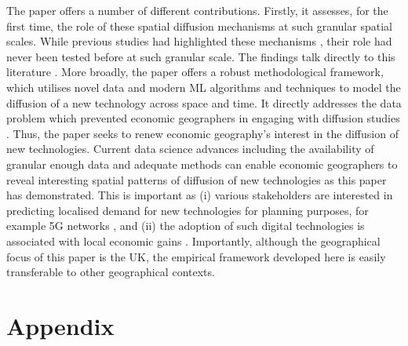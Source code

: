 \documentclass[
  authoryear,
  preprint,
  3p]{elsarticle}
\begin{document}
The paper offers a number of different contributions. Firstly, it
assesses, for the first time, the role of these spatial diffusion
mechanisms at such granular spatial scales. While previous studies had
highlighted these mechanisms
\citep{hagerstrand1968innovation, rogers2010diffusion, grubler1990rise},
their role had never been tested before at such granular scale. The
findings talk directly to this literature
\citep[e.g.][]{beardsell1999spatial, haller2011determinants, lengyel2020role}.
More broadly, the paper offers a robust methodological framework, which
utilises novel data and modern ML algorithms and techniques to model the
diffusion of a new technology across space and time. It directly
addresses the data problem which prevented economic geographers in
engaging with diffusion studies
\citep{iso2005, kemeny2011international, zook2022mapping}. Thus, the
paper seeks to renew economic geography's interest in the diffusion of
new technologies. Current data science advances including the
availability of granular enough data and adequate methods can enable
economic geographers to reveal interesting spatial patterns of diffusion
of new technologies as this paper has demonstrated. This is important as
(i) various stakeholders are interested in predicting localised demand
for new technologies for planning purposes, for example 5G networks
\citep{leibowicz2016representing, meade2021modelling}, and (ii) the
adoption of such digital technologies is associated with local economic
gains
\citep{solow1957technical, aghion1990model, kemeny2011international, tranosuk, capello2024nexus}.
Importantly, although the geographical focus of this paper is the UK,
the empirical framework developed here is easily transferable to other
geographical contexts.

\setcounter{section}{0}
\renewcommand{\thesection}{\Alph{section}}
\setcounter{table}{0}
\renewcommand{\thetable}{A\arabic{table}}
\setcounter{figure}{0}
\renewcommand{\thefigure}{A\arabic{figure}}

\section{Appendix}\label{appendix}

\end{document}
